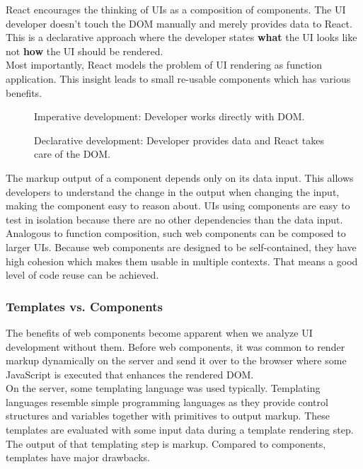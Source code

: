 React encourages the thinking of UIs as a composition of components. The UI developer doesn't touch the DOM manually and merely provides data to React. This is a declarative approach where the developer states \textbf{what} the UI looks like not \textbf{how} the UI should be rendered. \\
Most importantly, React models the problem of UI rendering as function application. This insight leads to small re-usable components which has various benefits.

\begin{figure}[!htb]
  \caption{Imperative development: Developer works directly with DOM.}
\end{figure}

\begin{figure}[!htb]
  \caption{Declarative development: Developer provides data and React takes care of the DOM.}
\end{figure}

The markup output of a component depends only on its data input. This allows developers to understand the change in the output when changing the input, making the component easy to reason about. UIs using components are easy to test in isolation because there are no other dependencies than the data input. Analogous to function composition, such web components can be composed to larger UIs. Because web components are designed to be self-contained, they have high cohesion which makes them usable in multiple contexts. That means a good level of code reuse can be achieved.

\subsubsection{Templates vs. Components}
The benefits of web components become apparent when we analyze UI development without them. Before web components, it was common to render markup dynamically on the server and send it over to the browser where some JavaScript is executed that enhances the rendered DOM. \\
On the server, some templating language was used typically. Templating languages resemble simple programming languages as they provide control structures and variables together with primitives to output markup. These templates are evaluated with some input data during a template rendering step. The output of that templating step is markup. Compared to components, templates have major drawbacks.

